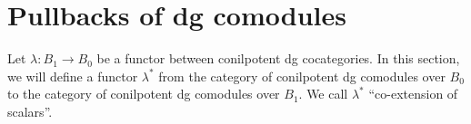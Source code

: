 \section{Pullbacks of dg comodules}\label{sec:pb_theory}
Let $\lambda: B_1 \to B_0$ be a 
functor between conilpotent 
dg cocategories. 
In this section, we will define 
a functor $\lambda^*$ from the 
category of conilpotent dg 
comodules over 
$B_0$ to the category of 
conilpotent dg 
comodules over $B_1$. We 
call $\lambda^*$
``co-extension of scalars''.
%

